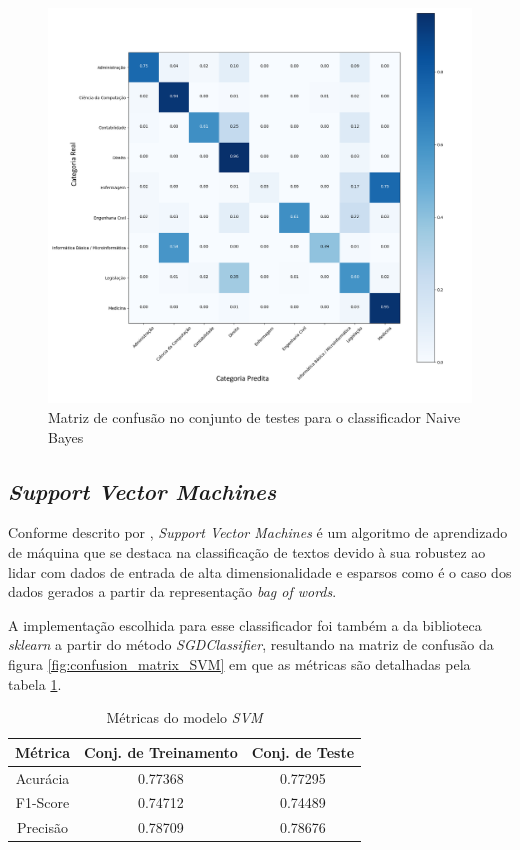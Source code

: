 \begin{figure}[!ht]
	\centering
	\includegraphics[width=1.1\textwidth]{figures/NB_-_Confusion_matrix_normalized_-_test.png}
	\caption{Matriz de confusão no conjunto de testes para o classificador Naive Bayes}
	\label{fig:confusion_matrix_NB}
\end{figure}

\subsection{\textit{Support Vector Machines}}

Conforme descrito por \cite{SVM4textClassification}, \textit{Support Vector Machines} é um algoritmo de aprendizado de máquina que se destaca na classificação de textos devido à sua robustez ao lidar com dados de entrada de alta dimensionalidade e esparsos como é o caso dos dados gerados a partir da representação \textit{bag of words}.

A implementação escolhida para esse classificador foi também a da biblioteca \textit{sklearn} a partir do método \textit{SGDClassifier}, resultando na matriz de confusão da figura \ref{fig:confusion_matrix_SVM} em que as métricas são detalhadas pela tabela \ref{tab:SVM}.

\begin{table}[ht]
\centering
\caption{Métricas do modelo \textit{SVM}}
\vspace{0.5cm}
\begin{tabular}{c|c|c}
 
Métrica & Conj. de Treinamento & Conj. de Teste \\
\hline
Acurácia & 0.77368 & 0.77295 \\
F1-Score & 0.74712 & 0.74489 \\
Precisão & 0.78709 & 0.78676
\end{tabular}
\label{tab:SVM}
\end{table}


